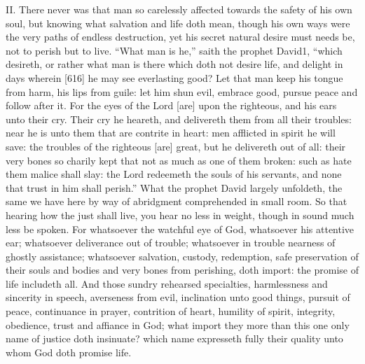 II.
There never was that man so carelessly affected towards the safety of his own soul, but knowing what salvation and life doth mean, though his own ways were the very paths of endless destruction, yet his secret natural desire must needs be, not to perish but to live. “What man is he,” saith the prophet David1, “which desireth, or rather what man is there which doth not desire life, and delight in days wherein [616] he may see everlasting good? Let that man keep his tongue from harm, his lips from guile: let him shun evil, embrace good, pursue peace and follow after it. For the eyes of the Lord [are] upon the righteous, and his ears unto their cry. Their cry he heareth, and delivereth them from all their troubles: near he is unto them that are contrite in heart: men afflicted in spirit he will save: the troubles of the righteous [are] great, but he delivereth out of all: their very bones so charily kept that not as much as one of them broken: such as hate them malice shall slay: the Lord redeemeth the souls of his servants, and none that trust in him shall perish.” What the prophet David largely unfoldeth, the same we have here by way of abridgment comprehended in small room. So that hearing how the just shall live, you hear no less in weight, though in sound much less be spoken. For whatsoever the watchful eye of God, whatsoever his attentive ear; whatsoever deliverance out of trouble; whatsoever in trouble nearness of ghostly assistance; whatsoever salvation, custody, redemption, safe preservation of their souls and bodies and very bones from perishing, doth import: the promise of life includeth all. And those sundry rehearsed specialties, harmlessness and sincerity in speech, averseness from evil, inclination unto good things, pursuit of peace, continuance in prayer, contrition of heart, humility of spirit, integrity, obedience, trust and affiance in God; what import they more than this one only name of justice doth insinuate? which name expresseth fully their quality unto whom God doth promise life.


